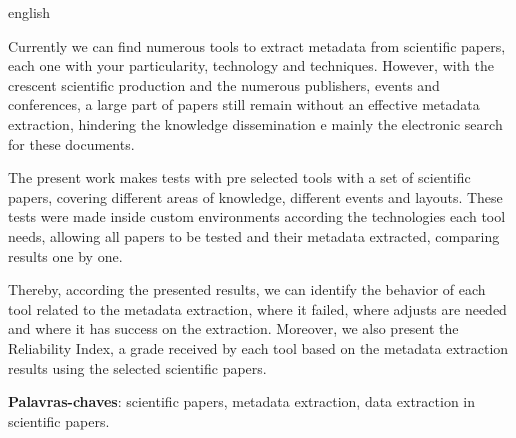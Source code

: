 \begin{resumo}[Abstract]
\begin{otherlanguage*}{english}

Currently we can find numerous tools to extract metadata from scientific papers, each one with your particularity, technology and techniques. However, with the crescent scientific production and the numerous publishers, events and conferences, a large part of papers still remain without an effective metadata extraction, hindering the knowledge dissemination e mainly the electronic search for these documents.

The present work makes tests with pre selected tools with a set of scientific papers, covering different areas of knowledge, different events and layouts. These tests were made inside custom environments according the technologies each tool needs, allowing all papers to be tested and their metadata extracted, comparing results one by one.

Thereby, according the presented results, we can identify the behavior of each tool related to the metadata extraction, where it failed, where adjusts are needed and where it has success on the extraction. Moreover, we also present the Reliability Index, a grade received by each tool based on the metadata extraction results using the selected scientific papers.

\textbf{Palavras-chaves}: scientific papers, metadata extraction, data extraction in scientific papers.


\end{otherlanguage*}
\end{resumo}

 

  
